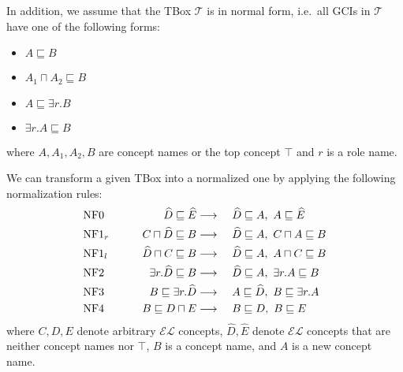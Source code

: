 In addition, we assume that the TBox $\mathcal{T}$ is in normal form,
i.e.\ all GCIs in $\mathcal{T}$ have one of the following forms:
\begin{itemize}
	\item $A \sqsubseteq B$
	\item $A_1 \sqcap A_2 \sqsubseteq B$
	\item $A \sqsubseteq \exists r.B$
	\item $\exists r. A \sqsubseteq B$
\end{itemize}
where $A, A_1, A_2, B$ are concept names or the top concept $\top$ and $r$ is a role name.
\begin{mdframed}[frametitle= Normalisation of an $\mathcal{EL}$ TBox]
	We can transform a given TBox into a normalized one by applying the following normalization rules:
	\begin{alignat*}{3}
		&\var{NF0} \qquad& \widehat{D} \sqsubseteq \widehat{E} &\longrightarrow\ &&\widehat{D} \sqsubseteq A,\ A \sqsubseteq \widehat{E} \\
		&\var{NF1}_r \qquad& C \sqcap \widehat{D} \sqsubseteq B &\longrightarrow\ &&\widehat{D} \sqsubseteq A,\ C \sqcap A \sqsubseteq B \\
		&\var{NF1}_l \qquad& \widehat{D} \sqcap C \sqsubseteq B &\longrightarrow\ &&\widehat{D} \sqsubseteq A,\ A \sqcap C \sqsubseteq B \\
		&\var{NF2} \qquad& \exists r.\widehat{D} \sqsubseteq B &\longrightarrow\ &&\widehat{D} \sqsubseteq A,\ \exists r.A \sqsubseteq B\\
		&\var{NF3} \qquad& B \sqsubseteq \exists r. \widehat{D} &\longrightarrow\ && A \sqsubseteq \widehat{D},\ B \sqsubseteq \exists r.A \\
		&\var{NF4} \qquad & B \sqsubseteq D \sqcap E &\longrightarrow\ && B \sqsubseteq D,\ B \sqsubseteq E
	\end{alignat*}
	where $C, D, E$ denote arbitrary $\mathcal{EL}$ concepts,
	$\widehat{D}, \widehat{E}$ denote $\mathcal{EL}$ concepts that are neither concept names nor $\top$,
	$B$ is a concept name, and $A$ is a new concept name.
\end{mdframed}

